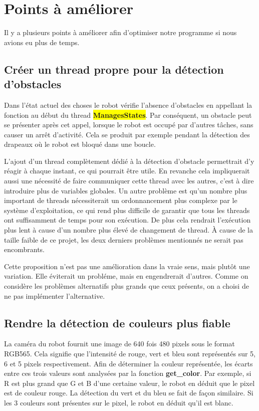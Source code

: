 \documentclass{article}
\begin{document}
    \section{Points à améliorer}
    Il y a plusieurs points à améliorer afin d'optimiser notre programme si nous avions eu plus de temps.

    \subsection{Créer un thread propre pour la détection d'obstacles}
    Dans l'état actuel des choses le robot vérifie l'absence d'obstacles en appellant la  fonction au début du thread \colorbox{yellow}{\textbf{ManagesStates}}.
    Par conséquent, un obstacle peut se présenter après cet appel, lorsque le robot est occupé par d'autres tâches, sans causer un arrêt d'activité.
    Cela se produit par exemple pendant la détection des drapeaux où le robot est bloqué dans une boucle.

    L'ajout d'un thread complètement dédié à la détection d'obstacle permettrait d'y réagir à chaque instant, ce qui pourrait être utile.
    En revanche cela impliquerait aussi une nécessité de faire communiquer cette thread avec les autres, c'est à dire introduire plus de variables globales.
    Un autre problème est qu'un nombre plus important de threads nécessiterait un ordonnancement plus complexe par le système d'exploitation, ce qui rend plus difficile de garantir que tous les threads ont suffisamment de temps pour son exécution.
    De plus cela rendrait l'exécution plus lent à cause d'un nombre plus élevé de changement de thread.
    À cause de la taille faible de ce projet, les deux derniers problèmes mentionnés ne serait pas encombrants.
    
    Cette proposition n'est pas une amélioration dans la vraie sens, mais plutôt une variation.
    Elle éviterait un probléme, mais en engendrerait d'autres.
    Comme on considère les problèmes alternatifs plus grands que ceux présents, on a choisi de ne pas implémenter l'alternative.

    \subsection{Rendre la détection de couleurs plus fiable}
    \label{améliorer_couleur}
    La caméra du robot fournit une image de 640 fois 480 pixels sous le format RGB565.
    Cela signifie que l'intensité de rouge, vert et bleu sont représentés sur 5, 6 et 5 pixels respectivement.
    Afin de déterminer la couleur représentée, les écarts entre ces trois valeurs sont analysées par la fonction \textbf{get\_color}.
    Par exemple, si R est plus grand que G et B d'une certaine valeur, le robot en déduit que le pixel est de couleur rouge.
    La détection du vert et du bleu se fait de façon similaire.
    Si les 3 couleurs sont présentes sur le pixel, le robot en déduit qu'il est blanc.
    
\end{document}
